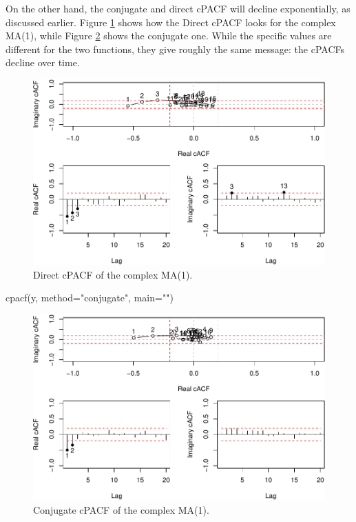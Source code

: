\documentclass[
]{book}
\newenvironment{Shaded}{\begin{snugshade}}{\end{snugshade}}
\newcommand{\AttributeTok}[1]{\textcolor[rgb]{0.77,0.63,0.00}{#1}}
\newcommand{\FunctionTok}[1]{\textcolor[rgb]{0.00,0.00,0.00}{#1}}
\newcommand{\NormalTok}[1]{#1}
\newcommand{\StringTok}[1]{\textcolor[rgb]{0.31,0.60,0.02}{#1}}
\begin{document}
On the other hand, the conjugate and direct cPACF will decline exponentially, as discussed earlier. Figure \ref{fig:complexMA1cpACFDir} shows how the Direct cPACF looks for the complex MA(1), while Figure \ref{fig:complexMA1cPACF} shows the conjugate one. While the specific values are different for the two functions, they give roughly the same message: the cPACFs decline over time.

\begin{figure}
\centering
\includegraphics{Svetunkov---Svetunkov---Complex-Valued-Econometrics_files/figure-latex/complexMA1cpACFDir-1.pdf}
\caption{\label{fig:complexMA1cpACFDir}Direct cPACF of the complex MA(1).}
\end{figure}

\begin{Shaded}
\begin{Highlighting}[]
\FunctionTok{cpacf}\NormalTok{(y, }\AttributeTok{method=}\StringTok{"conjugate"}\NormalTok{, }\AttributeTok{main=}\StringTok{""}\NormalTok{)}
\end{Highlighting}
\end{Shaded}

\begin{figure}
\centering
\includegraphics{Svetunkov---Svetunkov---Complex-Valued-Econometrics_files/figure-latex/complexMA1cPACF-1.pdf}
\caption{\label{fig:complexMA1cPACF}Conjugate cPACF of the complex MA(1).}
\end{figure}
\end{document}
